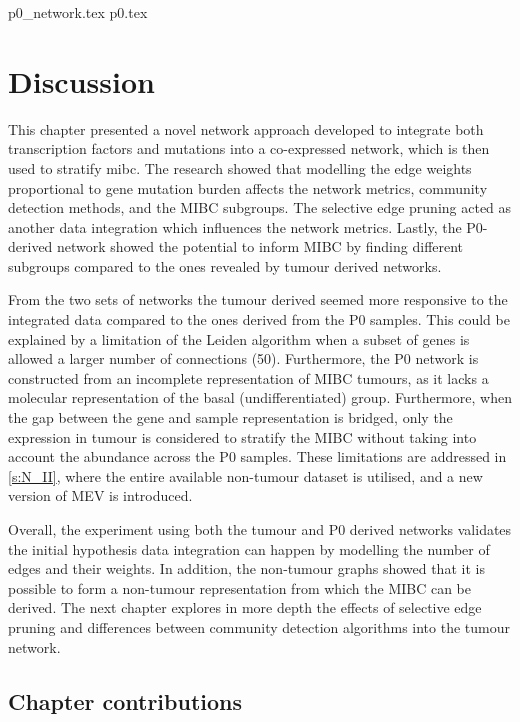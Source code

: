{p0_network.tex}
{p0.tex}


\section{Discussion}


This chapter presented a novel network approach developed to integrate both transcription factors and mutations into a co-expressed network, which is then used to stratify \acrlong{mibc}. The research showed that modelling the edge weights proportional to gene mutation burden affects the network metrics, community detection methods, and the MIBC subgroups. The selective edge pruning acted as another data integration which influences the network metrics. Lastly, the P0-derived network showed the potential to inform MIBC by finding different subgroups compared to the ones revealed by tumour derived networks.

From the two sets of networks the tumour derived seemed more responsive to the integrated data compared to the ones derived from the P0 samples. This could be explained by a limitation of the Leiden algorithm when a subset of genes is allowed a larger number of connections (50). Furthermore, the P0 network is constructed from an incomplete representation of MIBC tumours, as it lacks a molecular representation of the basal (undifferentiated) group. Furthermore, when the gap between the gene and sample representation is bridged, only the expression in tumour is considered to stratify the MIBC without taking into account the abundance across the P0 samples. These limitations are addressed in \cref{s:N_II}, where the entire available non-tumour dataset is utilised, and a new version of MEV is introduced.


Overall, the experiment using both the tumour and P0 derived networks validates the initial hypothesis data integration can happen by modelling the number of edges and their weights. In addition, the non-tumour graphs showed that it is possible to form a non-tumour representation from which the MIBC can be derived. The next chapter explores in more depth the effects of selective edge pruning and differences between community detection algorithms into the tumour network.

\subsection{Chapter contributions}

